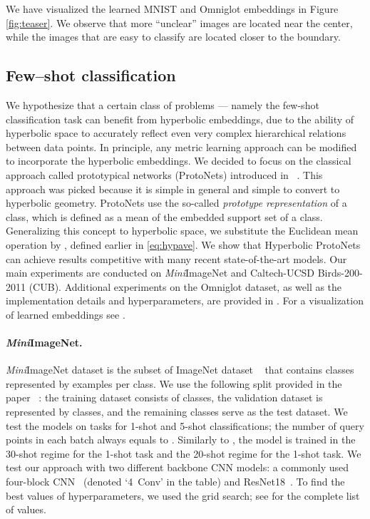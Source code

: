 \documentclass[10pt,twocolumn,letterpaper]{article}
\begin{document}
We have visualized the learned MNIST and Omniglot embeddings in Figure \ref{fig:teaser}. We observe that more ``unclear'' images are located near the center, while the images that are easy to classify are located closer to the boundary.

\subsection{Few--shot classification}\label{subsec:omni}

We hypothesize that a certain class of problems --- namely the few-shot classification task can benefit from hyperbolic embeddings, due to the ability of hyperbolic space to accurately reflect even very complex hierarchical relations between data points. In principle, any metric learning approach can be modified to incorporate the hyperbolic embeddings. We decided to focus on the classical approach called prototypical networks (ProtoNets) introduced in ~\cite{snell2017prototypical_net}. This approach was picked because it is simple in general and simple to convert to hyperbolic geometry. ProtoNets use the so-called \emph{prototype representation} of a class, which is defined as a mean of the embedded support set of a class. Generalizing this concept to hyperbolic space, we substitute the Euclidean mean operation by , defined earlier in \eqref{eq:hypave}. We show that Hyperbolic ProtoNets can achieve results competitive with many recent state-of-the-art models. Our main experiments are conducted on \textit{Mini}ImageNet and Caltech-UCSD Birds-200-2011 (CUB). Additional experiments on the Omniglot dataset, as well as the implementation details and hyperparameters, are provided in . For a visualization of learned embeddings see .









\paragraph{\textbf{\textit{Mini}}ImageNet.}
\textit{Mini}ImageNet dataset is the subset of ImageNet dataset ~\cite{russakovsky2015imagenet} that contains  classes represented by  examples per class. We use the following split provided in the paper ~\cite{ravi2016optimization}: the training dataset consists of  classes, the validation dataset is represented by  classes, and the remaining  classes serve as the test dataset. We test the models on tasks for 1-shot and 5-shot classifications; the number of query points in each batch always equals to . Similarly to \cite{snell2017prototypical_net}, the model is trained in the 30-shot regime for the 1-shot task and the 20-shot regime for the 1-shot task. We test our approach with two different backbone CNN models: a commonly used four-block CNN~\cite{snell2017prototypical_net,chen2018a} (denoted `4~Conv' in the table) and ResNet18~\cite{he2016deep}. To find the best values of hyperparameters, we used the grid search; see  for the complete list of values.
\end{document}
